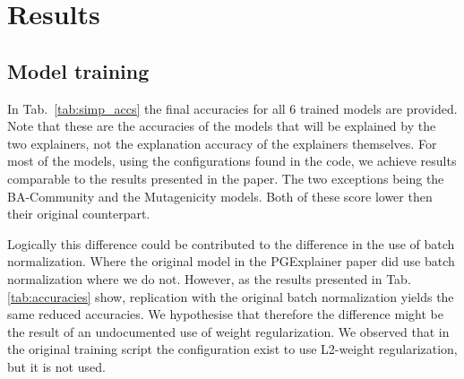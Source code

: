 \section{Results}\label{sec:results}

\subsection{Model training }
\begin{table}[]
\centering
\small
{}
\caption{Accuracies of the trained model without batch-normalization. The accuracies are obtained using early stopping. }
\label{tab:simp_accs}
\end{table}
In Tab.~\ref{tab:simp_accs} the final accuracies for all 6 trained models are provided. Note that these are the accuracies of the models that will be explained by the two explainers, not the explanation accuracy of the explainers themselves. For most of the models, using the configurations found in the code, we achieve results comparable to the results presented in the paper. The two exceptions being the BA-Community and the Mutagenicity models. Both of these score lower then their original counterpart. 

Logically this difference could be contributed to the difference in the use of batch normalization. Where the original model in the PGExplainer paper did use batch normalization where we do not. However, as the results presented in Tab.\,\ref{tab:accuracies} show, replication with the original batch normalization yields the same reduced accuracies. We hypothesise that therefore the difference might be the result of an undocumented use of weight regularization. We observed that in the original training script the configuration exist to use L2-weight regularization, but it is not used.

